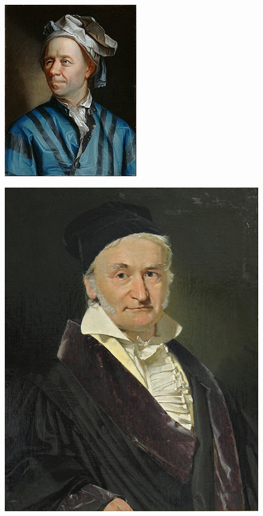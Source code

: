 \documentclass[12pt]{article}
\theoremstyle{plain}
\begin{document}
	\begin{figure}[h!]
		\begin{minipage}{.5\textwidth}
			\centering
			\includegraphics[width=.4\linewidth]{euler.jpg}
			\label{fig:euler}
		\end{minipage}
		\begin{minipage}{.5\textwidth}
			\centering
			\includegraphics[width=.4\linewidth]{gauss.jpg}
			\label{fig:gauss}
		\end{minipage}
	\end{figure}
\end{document}
